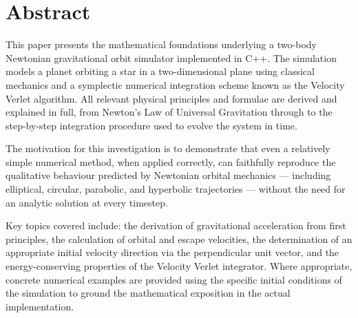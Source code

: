 \section{Abstract}

This paper presents the mathematical foundations underlying a two-body Newtonian gravitational orbit simulator implemented in C++. The simulation models a planet orbiting a star in a two-dimensional plane using classical mechanics and a symplectic numerical integration scheme known as the Velocity Verlet algorithm. All relevant physical principles and formulae are derived and explained in full, from Newton's Law of Universal Gravitation through to the step-by-step integration procedure used to evolve the system in time.

The motivation for this investigation is to demonstrate that even a relatively simple numerical method, when applied correctly, can faithfully reproduce the qualitative behaviour predicted by Newtonian orbital mechanics — including elliptical, circular, parabolic, and hyperbolic trajectories — without the need for an analytic solution at every timestep.

Key topics covered include: the derivation of gravitational acceleration from first principles, the calculation of orbital and escape velocities, the determination of an appropriate initial velocity direction via the perpendicular unit vector, and the energy-conserving properties of the Velocity Verlet integrator. Where appropriate, concrete numerical examples are provided using the specific initial conditions of the simulation to ground the mathematical exposition in the actual implementation.